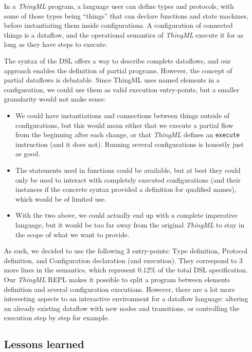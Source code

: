 In a \textit{ThingML} program, a language user can define types and protocols, with some of those types being ``things'' that can declare functions and state machines, before instantiating them inside configurations. A configuration of connected things is a dataflow, and the operational semantics of \textit{ThingML} execute it for as long as they have steps to execute.

The syntax of the DSL offers a way to describe complete dataflows, and our approach enables the definition of partial programs.
However, the concept of partial dataflows is debatable. %
Since ThingML uses named elements in a configuration, we could use them as valid execution entry-points, but a smaller granularity would not make sense:
\begin{itemize}
    \item We could have instantiations and connections between things outside of configurations, but this would mean either that we execute a partial flow from the beginning after each change, or that \textit{ThingML} defines an \verb|execute| instruction (and it does not). Running several configurations is honestly just as good.
    \item The statements used in functions could be available, but at best they could only be used to interact with completely executed configurations (and their instances if the concrete syntax provided a definition for qualified names), which would be of limited use.
    \item With the two above, we could actually end up with a complete imperative  language, but it would be too far away from the original \textit{ThingML} to stay in the scope of what we want to provide.
\end{itemize}

As such, we decided to use the following 3 entry-points: Type definition, Protocol definition, and Configuration declaration (and execution). They correspond to 3 more lines in the semantics, which represent $0.12\%$ of the total DSL specification.
Our \textit{ThingML} REPL makes it possible to split a program between elements definition and several configuration executions.
However, there are a lot more interesting aspects to an interactive environment for a dataflow language: altering an already existing dataflow with new nodes and transitions, or controlling the execution step by step for example.

\subsection*{Lessons learned}

